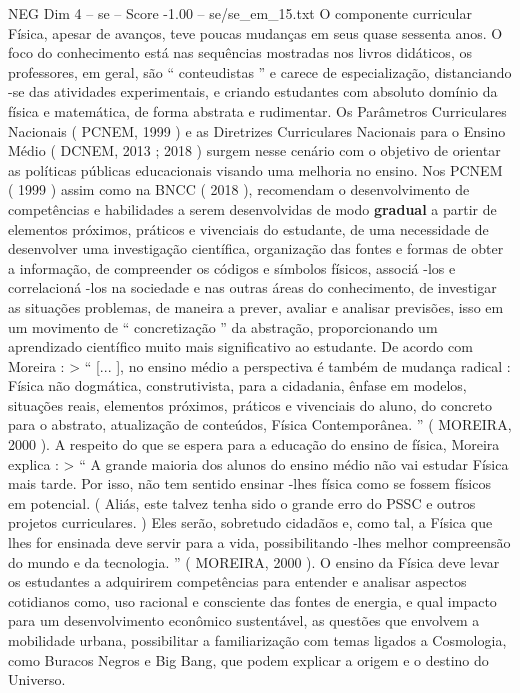 \begin{textsample}{NEG Dim 4 – se – Score -1.00 – se/se\_em\_15.txt}
O componente curricular Física, apesar de avanços, teve poucas mudanças em seus quase sessenta anos.
O foco do conhecimento está nas sequências mostradas nos livros didáticos, os professores, em geral, são “ conteudistas ” e carece de especialização, distanciando -se das atividades experimentais, e criando estudantes com absoluto domínio da física e matemática, de forma abstrata e rudimentar.
Os Parâmetros Curriculares Nacionais ( PCNEM, 1999 ) e as Diretrizes Curriculares Nacionais para o Ensino Médio ( DCNEM, 2013 ; 2018 ) surgem nesse cenário com o objetivo de orientar as políticas públicas educacionais visando uma melhoria no ensino.
Nos PCNEM ( 1999 ) assim como na BNCC ( 2018 ), recomendam o desenvolvimento de competências e habilidades a serem desenvolvidas de modo \textbf{gradual} a partir de elementos próximos, práticos e vivenciais do estudante, de uma necessidade de desenvolver uma investigação científica, organização das fontes e formas de obter a informação, de compreender os códigos e símbolos físicos, associá -los e correlacioná -los na sociedade e nas outras áreas do conhecimento, de investigar as situações problemas, de maneira a prever, avaliar e analisar previsões, isso em um movimento de “ concretização ” da abstração, proporcionando um aprendizado científico muito mais significativo ao estudante.
De acordo com Moreira : > “ [... ], no ensino médio a perspectiva é também de mudança radical : Física não dogmática, construtivista, para a cidadania, ênfase em modelos, situações reais, elementos próximos, práticos e vivenciais do aluno, do concreto para o abstrato, atualização de conteúdos, Física Contemporânea. ” ( MOREIRA, 2000 ).
A respeito do que se espera para a educação do ensino de física, Moreira explica : > “ A grande maioria dos alunos do ensino médio não vai estudar Física mais tarde.
Por isso, não tem sentido ensinar -lhes física como se fossem físicos em potencial. ( Aliás, este talvez tenha sido o grande erro do PSSC e outros projetos curriculares. ) Eles serão, sobretudo cidadãos e, como tal, a Física que lhes for ensinada deve servir para a vida, possibilitando -lhes melhor compreensão do mundo e da tecnologia. ” ( MOREIRA, 2000 ).
O ensino da Física deve levar os estudantes a adquirirem competências para entender e analisar aspectos cotidianos como, uso racional e consciente das fontes de energia, e qual impacto para um desenvolvimento econômico sustentável, as questões que envolvem a mobilidade urbana, possibilitar a familiarização com temas ligados a Cosmologia, como Buracos Negros e Big Bang, que podem explicar a origem e o destino do Universo.

\end{textsample}
